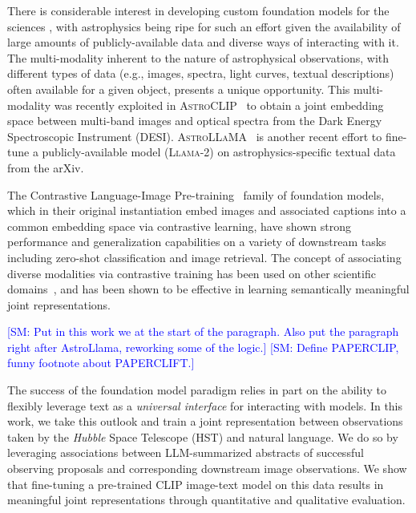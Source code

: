 \documentclass[10pt]{article} %
\newcommand{\SM}[1]{\textcolor{blue}{[SM: #1]}}
\newcommand{\hubble}{\emph{Hubble}\xspace}
\begin{document}
There is considerable interest in developing custom foundation models for the sciences \citep[e.g., ][]{batatia2023foundation,subramanian2023towards}, with astrophysics being ripe for such an effort given the availability of large amounts of publicly-available data and diverse ways of interacting with it.
%
The multi-modality inherent to the nature of astrophysical observations, with different types of data (e.g., images, spectra, light curves, textual descriptions) often available for a given object, presents a unique opportunity.
%
This multi-modality was recently exploited in \textsc{AstroCLIP}~\citep{lanusse2023astroclip} to obtain a joint embedding space between multi-band images and optical spectra from the Dark Energy Spectroscopic Instrument (DESI).
%
\textsc{AstroLLaMA}~\citep{nguyen2023astrollama,perkowski2024astrollama} is another recent effort to fine-tune a publicly-available model (\textsc{Llama-2}) on astrophysics-specific textual data from the arXiv.

The Contrastive Language-Image Pre-training~\citep[CLIP;][]{radford2021learning} family of foundation models, which in their original instantiation embed images and associated captions into a common embedding space via contrastive learning, have shown strong performance and generalization capabilities on a variety of downstream tasks including zero-shot classification and image retrieval.
%
The concept of associating diverse modalities via contrastive training has been used on other scientific domains~\citep[e.g.,][]{liu2023text,Sanchez-Fernandez2022.11.17.516915,lanusse2023astroclip,cepeda2023geoclip}, and has been shown to be effective in learning semantically meaningful joint representations.

\SM{Put in this work we at the start of the paragraph. Also put the paragraph right after AstroLlama, reworking some of the logic.} \SM{Define PAPERCLIP, funny footnote about PAPERCLIFT.}

The success of the foundation model paradigm relies in part on the ability to flexibly leverage text as a \emph{universal interface} for interacting with models.
%
In this work, we take this outlook and train a joint representation between observations taken by the \hubble Space Telescope (HST) and natural language.
%
We do so by leveraging associations between LLM-summarized abstracts of successful observing proposals and corresponding downstream image observations.
%
We show that fine-tuning a pre-trained CLIP image-text model on this data results in meaningful joint representations through quantitative and qualitative evaluation.
\end{document}
